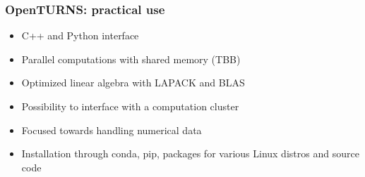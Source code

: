 \documentclass{beamer}
\begin{document}

\begin{frame}[containsverbatim]
  \frametitle{OpenTURNS: practical use}
  
  \small
  \begin{itemize}
  \item C++ and Python interface
  \vspace{10pt}
  \item Parallel computations with shared memory (TBB)
  \vspace{10pt}
  \item Optimized linear algebra with LAPACK and BLAS 
  \vspace{10pt}
  \item Possibility to interface with a computation cluster
  \vspace{10pt}
  \item Focused towards handling numerical data
  \vspace{10pt}
  \item Installation through conda, pip, packages for various Linux distros and source code
  \end{itemize}
\end{frame}
  

\end{document}
